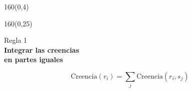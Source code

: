 \documentclass[shownotes,aspectratio=169]{beamer}
\newif\ifen
\newif\ifes
\newcommand{\en}[1]{\ifen#1\fi}
\newcommand{\es}[1]{\ifes#1\fi}
\begin{document}
\begin{frame}[plain]
\begin{textblock}{160}(0,4)
 \centering \LARGE 
 \en{Hidden variables and honest reasoning}
 \es{Creencias y razonamiento \textbf{honesto}}
 \end{textblock}
 
\begin{textblock}{160}(0,25)\centering
 \begin{center}
 Regla 1 \\
   \LARGE
\textbf{Integrar las creencias \\ en partes iguales}
 \end{center}
 
 \begin{equation*}
  \text{Creencia}(r_i) = \sum_j \text{Creencia}(r_i, s_j) 
 \end{equation*}
 
\end{textblock}

 
\end{frame}
\end{document}
